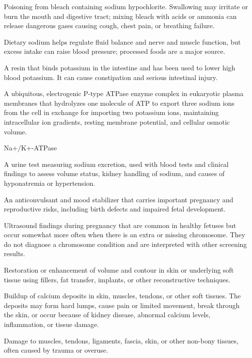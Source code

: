  Poisoning from bleach containing sodium hypochlorite. Swallowing may irritate or burn the mouth and digestive tract; mixing bleach with acids or ammonia can release dangerous gases causing cough, chest pain, or breathing failure.

 Dietary sodium helps regulate fluid balance and nerve and muscle function, but excess intake can raise blood pressure; processed foods are a major source.

 A resin that binds potassium in the intestine and has been used to lower high blood potassium. It can cause constipation and serious intestinal injury.

 A ubiquitous, electrogenic P-type ATPase enzyme complex in eukaryotic plasma membranes that hydrolyzes one molecule of ATP to export three sodium ions from the cell in exchange for importing two potassium ions, maintaining intracellular ion gradients, resting membrane potential, and cellular osmotic volume.

\synonyms
Na+/K+-ATPase

 A urine test measuring sodium excretion, used with blood tests and clinical findings to assess volume status, kidney handling of sodium, and causes of hyponatremia or hypertension.

 An anticonvulsant and mood stabilizer that carries important pregnancy and reproductive risks, including birth defects and impaired fetal development.

 Ultrasound findings during pregnancy that are common in healthy fetuses but occur somewhat more often when there is an extra or missing chromosome. They do not diagnose a chromosome condition and are interpreted with other screening results.

 Restoration or enhancement of volume and contour in skin or underlying soft tissue using fillers, fat transfer, implants, or other reconstructive techniques.

 Buildup of calcium deposits in skin, muscles, tendons, or other soft tissues. The deposits may form hard lumps, cause pain or limited movement, break through the skin, or occur because of kidney disease, abnormal calcium levels, inflammation, or tissue damage.

 Damage to muscles, tendons, ligaments, fascia, skin, or other non-bony tissues, often caused by
trauma or overuse.

